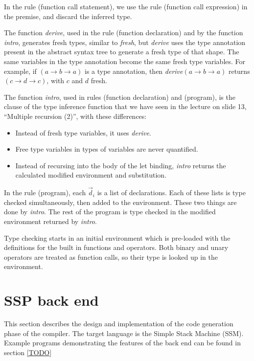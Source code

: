 \documentclass[a4paper]{article}
\newcommand{\arr}{\rightarrow}
\begin{document}
In the rule (function call statement), we use the rule (function call
expression) in the premise, and discard the inferred type.

The function \emph{derive}, used in the rule (function declaration) and by the
function \emph{intro}, generates fresh types, similar to \emph{fresh}, but
\emph{derive} uses the type annotation present in the abstract syntax tree to
generate a fresh type of that shape.  The same variables in the type annotation
become the same fresh type variables.  For example, if $(a \arr b \arr a)$ is a
type annotation, then \emph{derive}$(a \arr b \arr a)$ returns $(c \arr d \arr
c)$, with $c$ and $d$ fresh.

The function \emph{intro}, used in rules (function declaration) and (program),
is the clause of the type inference function that we have seen in the lecture on
slide 13, ``Multiple recursion (2)'', with these differences:

\begin{itemize}

  \item Instead of fresh type variables, it uses \emph{derive}.

  \item Free type variables in types of variables are never quantified.

  \item Instead of recursing into the body of the let binding, \emph{intro}
  returns the calculated modified environment and substitution.

\end{itemize}

In the rule (program), each $\vec{d}_i$ is a list of declarations.  Each of
these lists is type checked simultaneously, then added to the environment.
These two things are done by \emph{intro}.  The rest of the program is type
checked in the modified environment returned by \emph{intro}.

Type checking starts in an initial environment which is pre-loaded with the
definitions for the built in functions and operators.  Both binary and unary
operators are treated as function calls, so their type is looked up in the
environment.


\section{SSP back end}

This section describes the design and implementation of the code generation
phase of the compiler.  The target language is the Simple Stack Machine (SSM).
Example programs demonstrating the features of the back end can be found in
section \ref{TODO}
\end{document}
